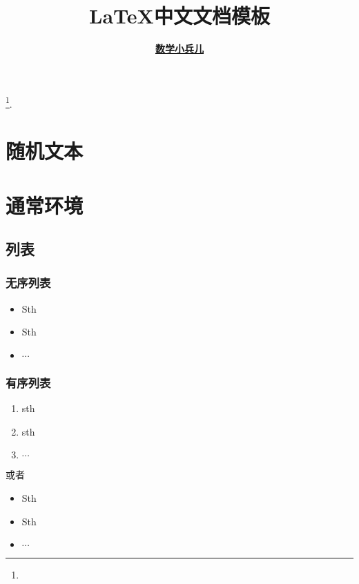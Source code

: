 \documentclass[a4paper, 12pt, UTF8]{ctexart}
\begin{document}
\title{\bf \LaTeX 中文文档模板} \author{\bf
  \href{https://matnoble.me/about/}{数学小兵儿}} \date{}

\maketitle
\tableofcontents
\footnote{\noindent {} \newline
  \updatetext{\today}}.

\clearpage
\listoflistings

\clearpage

\section{随机文本}
\zhlipsum[2-3]

\clearpage

\section{通常环境}

\subsection{列表}

\subsubsection{无序列表}
\begin{itemize}
    \item Sth
    \item Sth
    \item $\cdots$
\end{itemize}
\subsubsection{有序列表}
\begin{enumerate}
    \item sth
    \item sth
    \item $\cdots$
\end{enumerate}
或者
\begin{itemize}
    \item[(1)] Sth
    \item[(2)] Sth
    \item[(3)] $\cdots$
\end{itemize}
\end{document}
